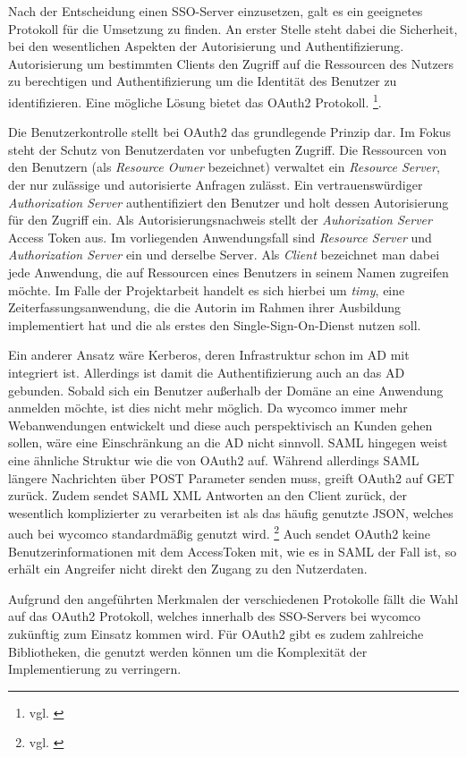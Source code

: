 Nach der Entscheidung einen \ac{SSO}-Server einzusetzen, galt es ein geeignetes Protokoll für die Umsetzung zu finden. An erster Stelle steht dabei die Sicherheit, bei den wesentlichen Aspekten der Autorisierung und Authentifizierung. Autorisierung um bestimmten Clients den Zugriff auf die Ressourcen des Nutzers zu berechtigen und Authentifizierung um die Identität des Benutzer zu identifizieren. Eine mögliche Lösung bietet das OAuth2 Protokoll. \footnote{vgl. \cite{OAuth2}}.

Die Benutzerkontrolle stellt bei OAuth2 das grundlegende Prinzip dar. Im Fokus steht der Schutz von Benutzerdaten vor unbefugten Zugriff. Die Ressourcen von den Benutzern (als \textit{Resource Owner} bezeichnet) verwaltet ein \textit{Resource Server}, der nur zulässige und autorisierte Anfragen zulässt. Ein vertrauenswürdiger \textit{Authorization Server} authentifiziert den Benutzer und holt dessen Autorisierung für den Zugriff ein. Als Autorisierungsnachweis stellt der \textit{Auhorization Server} Access Token aus. Im vorliegenden Anwendungsfall sind \textit{Resource Server} und \textit{Authorization Server} ein und derselbe Server.
Als \textit{Client} bezeichnet man dabei jede Anwendung, die auf Ressourcen eines Benutzers in seinem Namen zugreifen möchte. Im Falle der Projektarbeit handelt es sich hierbei um \textit{timy}, eine Zeiterfassungsanwendung, die die Autorin im Rahmen ihrer Ausbildung implementiert hat und die als erstes den Single-Sign-On-Dienst nutzen soll. 

Ein anderer Ansatz wäre Kerberos, deren Infrastruktur schon im \ac{AD} mit integriert ist. Allerdings ist damit die Authentifizierung auch an das \ac{AD} gebunden. Sobald sich ein Benutzer außerhalb der Domäne an eine Anwendung anmelden möchte, ist dies nicht mehr möglich. Da wycomco immer mehr Webanwendungen entwickelt und diese auch perspektivisch an Kunden gehen sollen, wäre eine Einschränkung an die AD nicht sinnvoll. 
\acs{SAML} hingegen weist eine ähnliche Struktur wie die von OAuth2 auf. Während allerdings SAML längere Nachrichten über POST Parameter senden muss, greift OAuth2 auf GET zurück. Zudem sendet SAML \acs{XML} Antworten an den Client zurück, der wesentlich komplizierter zu verarbeiten ist als das häufig genutzte \acs{JSON}, welches auch bei wycomco standardmäßig genutzt wird. \footnote{vgl. \cite{SSO-Vgl}}
Auch sendet OAuth2 keine Benutzerinformationen mit dem AccessToken mit, wie es in SAML der Fall ist, so erhält ein Angreifer nicht direkt den Zugang zu den Nutzerdaten.

Aufgrund den angeführten Merkmalen der verschiedenen Protokolle fällt die Wahl auf das OAuth2 Protokoll, welches innerhalb des \ac{SSO}-Servers bei wycomco zukünftig zum Einsatz kommen wird. Für OAuth2 gibt es zudem zahlreiche Bibliotheken, die genutzt werden können um die Komplexität der Implementierung zu verringern.

